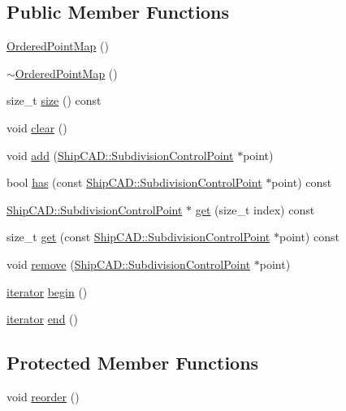 \subsection*{Public Member Functions}
\begin{DoxyCompactItemize}
\item 
\hyperlink{classOrderedPointMap_a5e74979296c587cfa9153358f286c4bb}{Ordered\+Point\+Map} ()
\item 
\hyperlink{classOrderedPointMap_ab7a8f5d61169c6ac0422de451ac155d1}{$\sim$\+Ordered\+Point\+Map} ()
\item 
size\+\_\+t \hyperlink{classOrderedPointMap_a17d63e3732a91baa412fd265d18ac7c1}{size} () const 
\item 
void \hyperlink{classOrderedPointMap_afc97596deeaa4241ab8533aa2df0f8cf}{clear} ()
\item 
void \hyperlink{classOrderedPointMap_a0d5a8aa95c1f0b1646ea79f18a26f5fb}{add} (\hyperlink{classShipCAD_1_1SubdivisionControlPoint}{Ship\+C\+A\+D\+::\+Subdivision\+Control\+Point} $\ast$point)
\item 
bool \hyperlink{classOrderedPointMap_aeeee3160dd7ee2ee0fb1f35fa424e676}{has} (const \hyperlink{classShipCAD_1_1SubdivisionControlPoint}{Ship\+C\+A\+D\+::\+Subdivision\+Control\+Point} $\ast$point) const 
\item 
\hyperlink{classShipCAD_1_1SubdivisionControlPoint}{Ship\+C\+A\+D\+::\+Subdivision\+Control\+Point} $\ast$ \hyperlink{classOrderedPointMap_ae87e03500550c05c9b5fe8bd5554a88a}{get} (size\+\_\+t index) const 
\item 
size\+\_\+t \hyperlink{classOrderedPointMap_a34672c121eb0c4ca4229735fd62ee86a}{get} (const \hyperlink{classShipCAD_1_1SubdivisionControlPoint}{Ship\+C\+A\+D\+::\+Subdivision\+Control\+Point} $\ast$point) const 
\item 
void \hyperlink{classOrderedPointMap_a4625fae33a120853edad2ff7bf28e63b}{remove} (\hyperlink{classShipCAD_1_1SubdivisionControlPoint}{Ship\+C\+A\+D\+::\+Subdivision\+Control\+Point} $\ast$point)
\item 
\hyperlink{classOrderedPointMap_ae58ae7176ea9345af14a8f53bbe57d69}{iterator} \hyperlink{classOrderedPointMap_a4e4a269c790a35950901207c0d9ff4fb}{begin} ()
\item 
\hyperlink{classOrderedPointMap_ae58ae7176ea9345af14a8f53bbe57d69}{iterator} \hyperlink{classOrderedPointMap_a2b4e1630f6b13dba32a7200c670331cf}{end} ()
\end{DoxyCompactItemize}
\subsection*{Protected Member Functions}
\begin{DoxyCompactItemize}
\item 
void \hyperlink{classOrderedPointMap_a23b5b6222b656298ba9d9a245ea382b5}{reorder} ()
\end{DoxyCompactItemize}
